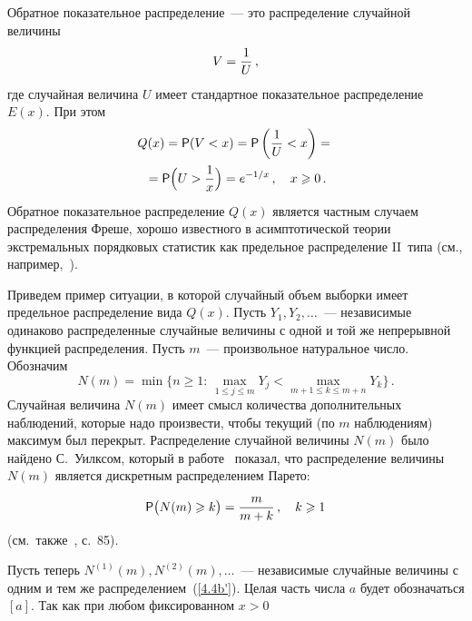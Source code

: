 \begin{multicols}{2}
Обратное показательное распределение~--- это распределение
случайной величины
$$
V=\displaystyle\frac{\displaystyle 1\mathstrut}{\displaystyle U\mathstrut}\,,
$$
где случайная величина $U$
имеет стандартное показательное распределение $E(x)$. При этом
\begin{multline*}
Q(x)={\sf P}(V<x)={\sf P}\left(\displaystyle\frac{\displaystyle 1\mathstrut}{\displaystyle U\mathstrut}<x\right)={}\\
{}={\sf P}\Big(U>\displaystyle\frac{\displaystyle 1\mathstrut}{\displaystyle x\mathstrut}\Big)=e^{-1/x}\,,\quad x\geqslant0\,.
\end{multline*}
Обратное показательное распределение $Q(x)$ является частным случаем
распределения Фреше, хорошо известного в асимптотической теории
экстремальных порядковых статистик как предельное распределение
II~типа (см., например,~\cite{7be}).

Приведем пример ситуации, в которой случайный объем выборки имеет
предельное распределение вида $Q(x)$. Пусть $Y_1,Y_2,\ldots$~---
независимые одинаково распределенные случайные величины с одной и
той же непрерывной функцией распределения. Пусть $m$~---
произвольное натуральное число. Обозначим
$$
N(m)=\min\big\{n\ge1:\,\max_{1\le j\le m}Y_j<\max_{m+1\le k\le
m+n}Y_k\big\}\,.
$$
Случайная величина $N(m)$ имеет смысл количества
дополнительных наблюдений, которые надо произвести, чтобы текущий
(по $m$ наблюдениям) максимум был перекрыт. Распределение
случайной величины $N(m)$ было найдено С.~Уилксом, который в
работе~\cite{54be} показал, что распределение величины $N(m)$ является
дискретным распределением Парето:
\begin{equation}
{\sf P}\big(N(m)\geqslant
k\big)=\displaystyle\frac{\displaystyle m\mathstrut}{\displaystyle m+k\mathstrut}\,,\quad k\geqslant1
\label{4.4b'}
\end{equation}
(см.\ также~\cite{15be},
с.~85).

Пусть теперь $N^{(1)}(m),N^{(2)}(m),\ldots$~--- независимые
случайные величины с одним и тем же распределением~(\ref{4.4b'}). Целая
часть числа $a$ будет обозначаться $[a]$. Так как при любом
фиксированном $x>0$


\end{multicols}
